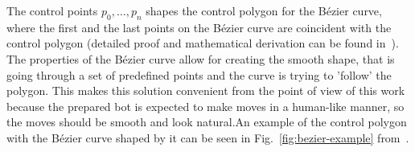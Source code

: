 The control points $p_0,\dots,p_n$ shapes the control polygon for the Bézier curve, where the first and the last points on the Bézier curve are coincident with the control polygon (detailed proof and mathematical derivation can be found in~\cite{farouki2012bernstein}).
The properties of the Bézier curve allow for creating the smooth shape, that is going through a set of predefined points and the curve is trying to 'follow' the polygon.
This makes this solution convenient from the point of view of this work because the prepared bot is expected to make moves in a human-like manner, so the moves should be smooth and look natural.An example of the control polygon with the Bézier curve shaped by it can be seen in Fig.~\ref{fig:bezier-example} from~\cite{farouki2012bernstein}.
